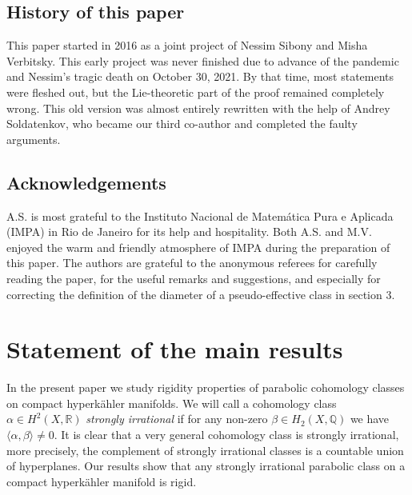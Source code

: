 \documentclass[11pt]{article}
\newcommand{\6}{\partial}
\newcommand{\bbQ}{\mathbb{Q}}
\newcommand{\bbR}{\mathbb{R}}
\begin{document}
\subsection{History of this paper}

This paper started in 2016 as a joint project of Nessim Sibony and Misha Verbitsky.
This early project was never finished due to advance of the pandemic
and Nessim's tragic death on October 30, 2021. By that time,
most statements were fleshed out, but the Lie-theoretic
part of the proof remained completely wrong. This old version was
almost entirely rewritten with the help of Andrey Soldatenkov,
who became our third co-author and completed the faulty arguments.


\subsection{Acknowledgements}

A.S. is most grateful to the Instituto Nacional de Matem\'atica Pura e
Aplicada (IMPA) in Rio de Janeiro for its help and hospitality. Both A.S. and M.V.
enjoyed the warm and friendly atmosphere of IMPA during the preparation
of this paper. The authors are grateful to the anonymous referees for
carefully reading the paper, for the useful remarks and suggestions,
and especially for correcting the definition of the diameter of a pseudo-effective class in section 3.


\section{Statement of the main results}



In the present paper we study rigidity properties of parabolic cohomology classes
on compact hyperk\"ahler manifolds. We will call a cohomology class $\alpha\in H^2(X,\bbR)$
{\em strongly irrational} if for any non-zero $\beta\in H_2(X,\bbQ)$ we have $\langle\alpha,\beta\rangle\neq 0$.
It is clear that a very general cohomology class is strongly irrational, more precisely,
the complement of strongly irrational classes is a countable union of hyperplanes. 
Our results show that any strongly irrational parabolic
class on a compact hyperk\"ahler manifold is rigid.
\end{document}
